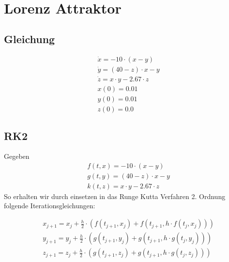 \documentclass[10pt]{scrartcl}
\begin{document}
		\section{Lorenz Attraktor}
		\subsection{Gleichung}
			\begin{align}
				&\dot{x}=-10 \cdot (x-y)\\
				&\dot{y}=(40-z)\cdot x-y\\
				&\dot{z}=x \cdot y - 2.67 \cdot z\\
				&x(0)=0.01\\
				&y(0)=0.01\\
				&z(0)=0.0
			\end{align}
		
		\subsection{RK2}
		Gegeben
			\begin{align}
				&f(t,x)=-10 \cdot (x-y)\\
				&g(t,y)=(40-z)\cdot x-y\\
				&k(t,z)=x \cdot y - 2.67 \cdot z
			\end{align}
		So erhalten wir durch einsetzen in das Runge Kutta Verfahren 2. Ordnung folgende Iterationsgleichungen:
		
		\begin{align}
				&x_{j+1}=x_{j} + \frac{h}{2} \cdot (f(t_{j+1}, x_{j}) + f(t_{j+1}, h \cdot f(t_j, x_j)) )\\
				&y_{j+1}=y_{j} + \frac{h}{2} \cdot (g(t_{j+1}, y_{j}) + g(t_{j+1}, h \cdot g(t_j, y_j)) )\\
				&z_{j+1}=z_{j} + \frac{h}{2} \cdot (g(t_{j+1}, z_{j}) + g(t_{j+1}, h \cdot g(t_j, z_j)) )
		\end{align}
\end{document}
